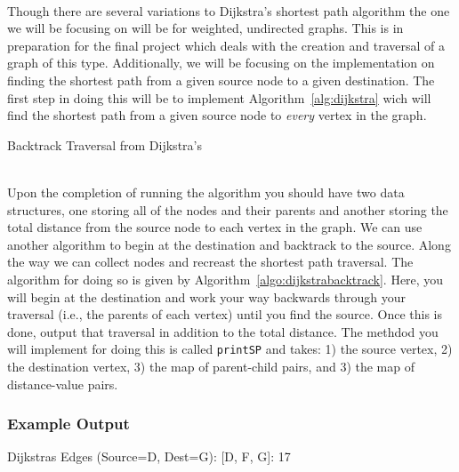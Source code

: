~\\
Though there are several variations to Dijkstra's shortest path algorithm the
one we will be focusing on will be for weighted, undirected graphs. This is in
preparation for the final project which deals with the creation and traversal
of a graph of this type. Additionally, we will be focusing on the
implementation on finding the shortest path from a given source node to a given
destination.  The first step in doing this will be to implement
Algorithm~\ref{alg:dijkstra} wich will find the shortest path from a given
source node to \textit{every} vertex in the graph. 
~\\

\begin{algorithm}[H]
    \caption{Backtrack Traversal from Dijkstra's}\label{algo:dijkstrabacktrack}
    \DontPrintSemicolon
\end{algorithm}

~\\
Upon the completion of running the algorithm you should have two data
structures, one storing all of the nodes and their parents and another storing
the total distance from the source node to each vertex in the graph.  We can
use another algorithm to begin at the destination and backtrack to the source.
Along the way we can collect nodes and recreast the shortest path traversal.
The algorithm for doing so is given by Algorithm~\ref{algo:dijkstrabacktrack}.
Here, you will begin at the destination and work your way backwards through
your traversal (i.e., the parents of each vertex) until you find the source.
Once this is done, output that traversal in addition to the total distance.
The methdod you will implement for doing this is called \lstinline|printSP|
and takes: 1) the source vertex, 2) the destination vertex, 3) the map of
parent-child pairs, and 3) the map of distance-value pairs.

\subsubsection*{Example Output}

\begin{shell}
Dijkstras Edges (Source=D, Dest=G):
[D, F, G]: 17
\end{shell}
